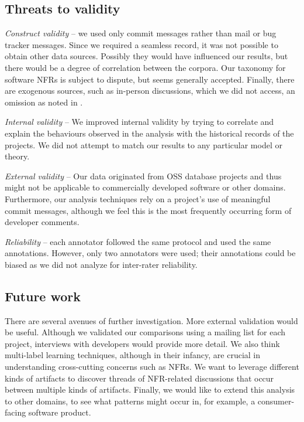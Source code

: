 \documentclass[]{sig-alternate}
\begin{document}
\subsection{Threats to validity}
\emph{Construct validity} -- we used only commit messages rather than mail or bug tracker messages. Since we required a seamless record, it was not possible to obtain other data sources. Possibly they would have influenced our results, but there would be a degree of correlation between the corpora.
Our taxonomy for software NFRs is subject to dispute, but seems generally accepted. Finally, there are exogenous sources, such as in-person discussions, which we did not access, an omission as noted in \cite{aranda09icse}. %

\emph{Internal validity} -- %
We improved internal validity by trying to correlate and explain the behaviours observed in the analysis with the historical records of the projects.
We did not attempt to match our results to any particular model or theory.

\emph{External validity} -- %
Our data originated from OSS database projects and thus might not be applicable to commercially developed software or other domains. 
Furthermore, our analysis techniques rely on a project's use of meaningful commit messages, although we feel this is the most frequently occurring form of developer comments. 

\emph{Reliability} -- each annotator followed the same protocol and used the same annotations. 
However, only two annotators were used; their annotations could be biased as we did not analyze for inter-rater reliability.

\subsection{Future work}
There are several avenues of further investigation.  
More external validation would be useful. 
Although we validated our comparisons using a mailing list for each project, interviews with developers would provide more detail. 
We also think multi-label learning techniques, although in their infancy, are crucial in understanding cross-cutting concerns such as NFRs. 
We want to leverage different kinds of artifacts to discover threads of NFR-related discussions that occur between multiple kinds of artifacts.
Finally, we would like to extend this analysis to other domains, to see what patterns might occur in, for example, a consumer-facing software product.
\end{document}
